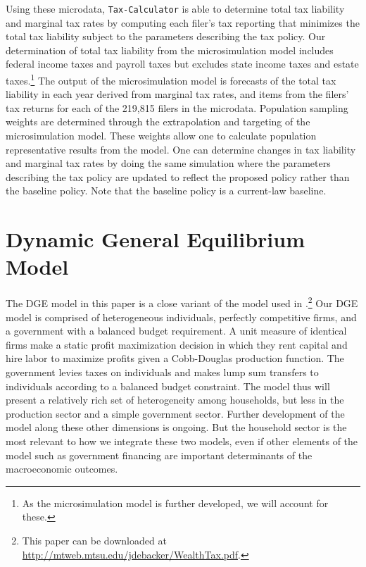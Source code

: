 \documentclass[letterpaper,12pt]{article}
\theoremstyle{definition}
\begin{document}
\begin{spacing}{1.5}
  Using these microdata, \texttt{Tax-Calculator} is able to determine total tax liability and marginal tax rates by computing each filer's tax reporting that minimizes the total tax liability subject to the parameters describing the tax policy. Our determination of total tax liability from the microsimulation model includes federal income taxes and payroll taxes but excludes state income taxes and estate taxes.\footnote{As the microsimulation model is further developed, we will account for these.} The output of the microsimulation model is forecasts of the total tax liability in each year derived from marginal tax rates, and items from the filers' tax returns for each of the 219,815 filers in the microdata. Population sampling weights are determined through the extrapolation and targeting of the microsimulation model. These weights allow one to calculate population representative results from the model. One can determine changes in tax liability and marginal tax rates by doing the same simulation where the parameters describing the tax policy are updated to reflect the proposed policy rather than the baseline policy. Note that the baseline policy is a current-law baseline.


\section{Dynamic General Equilibrium Model}\label{SecDGE}

  The DGE model in this paper is a close variant of the model used in \citet{DEMPRW2015}.\footnote{This paper can be downloaded at \href{http://mtweb.mtsu.edu/jdebacker/WealthTax.pdf}{http://mtweb.mtsu.edu/jdebacker/WealthTax.pdf}.} Our DGE model is comprised of heterogeneous individuals, perfectly competitive firms, and a government with a balanced budget requirement. A unit measure of identical firms make a static profit maximization decision in which they rent capital and hire labor to maximize profits given a Cobb-Douglas production function. The government levies taxes on individuals and makes lump sum transfers to individuals according to a balanced budget constraint. The model thus will present a relatively rich set of heterogeneity among households, but less in the production sector and a simple government sector.  Further development of the model along these other dimensions is ongoing. But the household sector is the most relevant to how we integrate these two models, even if other elements of the model such as government financing are important determinants of the macroeconomic outcomes.


\end{spacing}
\end{document}
